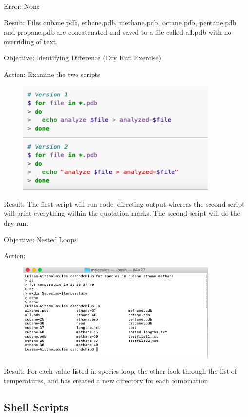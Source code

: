 \documentclass{article}
\begin{document}
Error: None

Result: Files cubane.pdb, ethane.pdb, methane.pdb, octane.pdb, pentane.pdb and propane.pdb are concatenated and saved to a file called all.pdb with no overriding of text.

Objective: Identifying Difference (Dry Run Exercise)\par
Action: Examine the two scripts\par
\begin{figure}[htp]
    \centering
    \includegraphics[width=10cm]{Screenshot18.png}
    \label{fig:ls-18}
\end{figure}

Result: The first script will run code, directing output whereas the second script will print everything within the quotation marks. The second script will do the dry run.

Objective: Nested Loops\par
Action: \par
\begin{figure}[htp]
    \centering
    \includegraphics[width=10cm]{Screenshot19.png}
    \label{fig:ls-19}
\end{figure}

Result: For each value listed in species loop, the other look through the list of temperatures, and has created a new directory for each combination.

\subsection{Shell Scripts}
\end{document}
